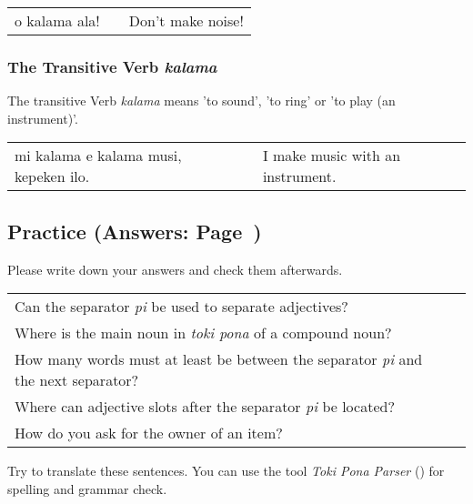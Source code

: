 \begin{supertabular}{p{5,5cm}|ll}
    o kalama ala! &  & Don't make noise! \\
\end{supertabular}

%
\subsubsection*{The Transitive Verb \textit{kalama}}
%
%

The transitive Verb \textit{kalama} means 'to sound', 'to ring' or 'to play (an instrument)'.

\begin{supertabular}{p{5,5cm}|ll}
    mi kalama e kalama musi, kepeken ilo. &  & I make music with an instrument. \\
\end{supertabular}

%
%
%
%
\newpage
%
\subsection*{Practice (Answers: Page~\pageref{'pi'})}
%
Please write down your answers and check them afterwards.

\begin{supertabular}{p{5,5cm}|ll}
    Can the separator \textit{pi} be used to separate adjectives?                             &  & \\ %
    Where is the main noun in \textit{toki pona} of a compound noun?                          &  & \\ %
    How many words must at least be between the separator \textit{pi} and the next separator? &  & \\ %
    Where can adjective slots after the separator \textit{pi} be located?                     &  & \\ %
    How do you ask for the owner of an item?                                                  &  & \\ %
\end{supertabular}

Try to translate these sentences.
You can use the tool \textit{Toki Pona Parser} (\cite{www:rowa:02}) for spelling and grammar check.

